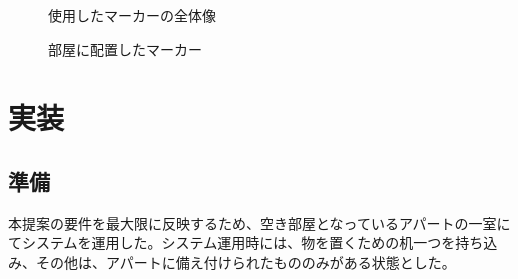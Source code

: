\begin{figure}[htbp]
  \begin{minipage}{0.5\hsize}
    \begin{center}
    \end{center}
    \caption{使用したマーカーの全体像}
  \end{minipage}
  \begin{minipage}{0.5\hsize}
    \begin{center}
    \end{center}
    \caption{部屋に配置したマーカー}
  \end{minipage}
\end{figure}


\section{実装}

\subsection{準備}

本提案の要件を最大限に反映するため、空き部屋となっているアパートの一室にてシステムを運用した。システム運用時には、物を置くための机一つを持ち込み、その他は、アパートに備え付けられたもののみがある状態とした。

